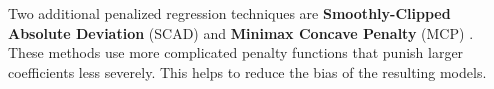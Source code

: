 \documentclass{article}
\begin{document}
	Two additional penalized regression techniques are \textbf{Smoothly-Clipped Absolute Deviation} (SCAD) and \textbf{Minimax Concave Penalty} (MCP) \cite{fan2001variable, zhang2010nearly}. These methods use more complicated penalty functions that punish larger coefficients less severely. This helps to reduce the bias of the resulting models.

\end{document}
